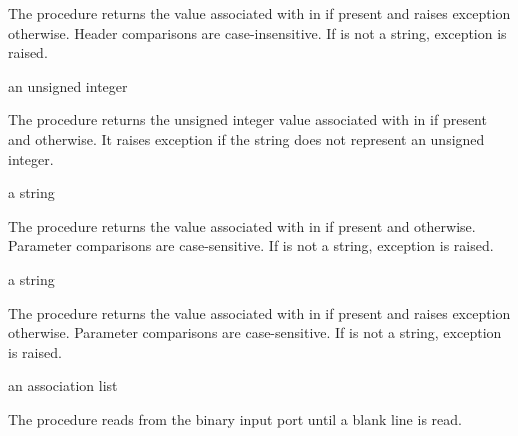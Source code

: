 The  procedure returns the value associated with
 in  if present and raises exception
 otherwise. Header
comparisons are case-insensitive. If  is not a string,
exception  is raised.

\begin{procedure}
\end{procedure}
\returns{} an unsigned integer \alt{} 

The  procedure returns the unsigned
integer value associated with  in  if
present and  otherwise. It raises exception
 if the 
string does not represent an unsigned integer.

\begin{procedure}
\end{procedure}
\returns{} a string \alt{} 

The  procedure returns the value associated with
 in  if present and 
otherwise. Parameter comparisons are case-sensitive. If  is
not a string, exception 
is raised.

\begin{procedure}
\end{procedure}
\returns{} a string

The  procedure returns the value associated with
 in  if present and raises exception
 otherwise. Parameter
comparisons are case-sensitive. If  is not a string,
exception  is raised.

\begin{procedure}
\end{procedure}
\returns{} an association list

The  procedure reads from the binary input
port  until a blank line is read.

